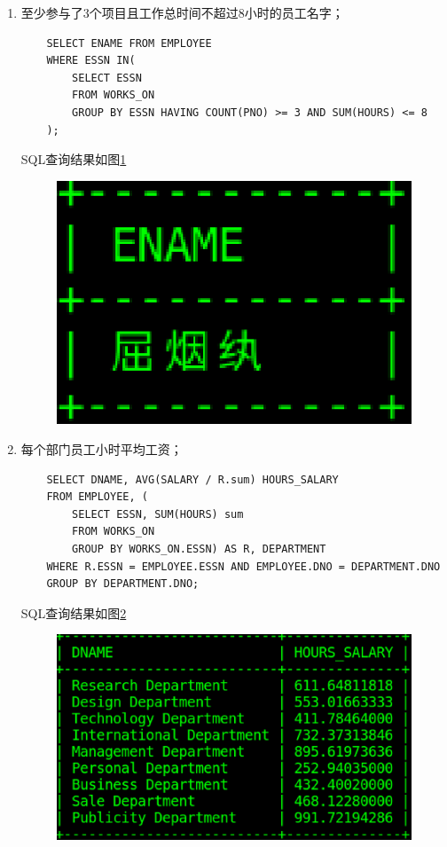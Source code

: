 \documentclass{ML}
\begin{document}
\begin{enumerate}
    \item 至少参与了3个项目且工作总时间不超过8小时的员工名字；
    \begin{verbatim}
    SELECT ENAME FROM EMPLOYEE
    WHERE ESSN IN(
        SELECT ESSN
        FROM WORKS_ON
        GROUP BY ESSN HAVING COUNT(PNO) >= 3 AND SUM(HOURS) <= 8
    );
    \end{verbatim}
    SQL查询结果如图\ref{fig:8}
    \begin{figure}[htb]
        \centering
        \includegraphics[scale=0.4, bb=0 0 148 100]{media/3.1.8.eps}
        \caption{}\label{fig:8}
    \end{figure}
    \item 每个部门员工小时平均工资；
    \begin{verbatim}
    SELECT DNAME, AVG(SALARY / R.sum) HOURS_SALARY
    FROM EMPLOYEE, (
        SELECT ESSN, SUM(HOURS) sum
        FROM WORKS_ON
        GROUP BY WORKS_ON.ESSN) AS R, DEPARTMENT
    WHERE R.ESSN = EMPLOYEE.ESSN AND EMPLOYEE.DNO = DEPARTMENT.DNO
    GROUP BY DEPARTMENT.DNO;
    \end{verbatim}
    SQL查询结果如图\ref{fig:9}
    \begin{figure}[htb]
        \centering
        \includegraphics[scale=0.4, bb=0 0 474 274]{media/3.1.9.eps}
        \caption{}\label{fig:9}
    \end{figure}
\end{enumerate}
\end{document}
